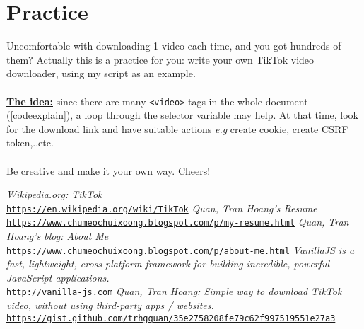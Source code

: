 \documentclass{article}
\begin{document}
\section{Practice}
Uncomfortable with downloading 1 video each time, and you got hundreds of them? Actually this is a practice for you: write your own TikTok video downloader, using my script as an example.
\\\\
\underline{\textbf{The idea:}} since there are many \verb|<video>| tags in the whole document (\ref{codeexplain}), a loop through the selector variable may help. At that time, look for the download link and have suitable actions \textit{e.g} create cookie, create CSRF token,..etc.
\\\\
Be creative and make it your own way. Cheers!

\medskip
\begin{thebibliography}{9}
\textit{Wikipedia.org: TikTok}
\\\texttt{\href{https://en.wikipedia.org/wiki/TikTok}{https://en.wikipedia.org/wiki/TikTok}}
\textit{Quan, Tran Hoang's Resume}
\\\texttt{\href{https://www.chumeochuixoong.blogspot.com/p/my-resume.html}{https://www.chumeochuixoong.blogspot.com/p/my-resume.html}}
\textit{Quan, Tran Hoang's blog: About Me}
\\\texttt{\href{https://www.chumeochuixoong.blogspot.com/p/about-me.html}{https://www.chumeochuixoong.blogspot.com/p/about-me.html}}
\textit{VanillaJS is a fast, lightweight, cross-platform framework
 for building incredible, powerful JavaScript applications.}
\\\texttt{\href{http://vanilla-js.com}{http://vanilla-js.com}}
\textit{Quan, Tran Hoang: Simple way to download TikTok video, without using third-party apps / websites. }
\\\texttt{\href{https://gist.github.com/trhgquan/35e2758208fe79c62f997519551e27a3}{https://gist.github.com/trhgquan/35e2758208fe79c62f997519551e27a3}}
\end{thebibliography}
\end{document}
